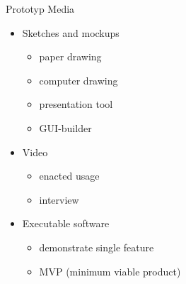 \begin{Slide}{Prototyp Media}
\begin{itemize}
\item Sketches and mockups
\begin{itemize}
\item paper drawing
\item computer drawing
\item presentation tool
\item GUI-builder
\end{itemize}
\item Video
\begin{itemize}
\item enacted usage
\item interview
\end{itemize}
\item Executable software
\begin{itemize}
\item demonstrate single feature 
\item MVP (minimum viable product)

\end{itemize}
\end{itemize}
\end{Slide}